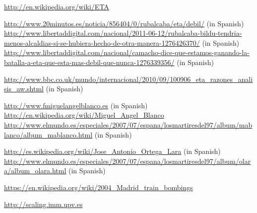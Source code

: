 \documentclass[12pt,a4paper]{report}
\begin{document}
\begin{thebibliography}{99}
 \url{http://en.wikipedia.org/wiki/ETA}

 \url{http://www.20minutos.es/noticia/856404/0/rubalcaba/eta/debil/} (in Spanish)
 \url{http://www.libertaddigital.com/nacional/2011-06-12/rubalcaba-bildu-tendria-menos-alcaldias-si-se-hubiera-hecho-de-otra-manera-1276426370/} (in Spanish)
 \url{http://www.libertaddigital.com/nacional/camacho-dice-que-estamos-ganando-la-batalla-a-eta-que-esta-mas-debil-que-nunca-1276339356/} (in Spanish)

 \url{http://www.bbc.co.uk/mundo/internacional/2010/09/100906_eta_razones_analisis_aw.shtml} (in Spanish)

 \url{http://www.fmiguelangelblanco.es} (in Spanish)
 \url{http://en.wikipedia.org/wiki/Miguel_Angel_Blanco}
 \url{http://www.elmundo.es/especiales/2007/07/espana/losmartiresdel97/album/mablanco/album_mablanco.html} (in Spanish)

 \url{http://es.wikipedia.org/wiki/Jose_Antonio_Ortega_Lara} (in Spanish)
 \url{http://www.elmundo.es/especiales/2007/07/espana/losmartiresdel97/album/olara/album_olara.html} (in Spanish)

 \url{https://en.wikipedia.org/wiki/2004_Madrid_train_bombings}

 \url{http://scaling.imm.upv.es}

\end{thebibliography}
\end{document}
